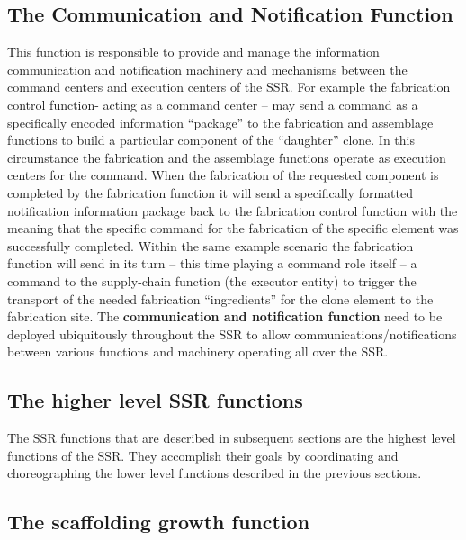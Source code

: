 \subsection[The Communication and Notification Function]{The
Communication and Notification Function}

\hypertarget{RefHeading3090306210128}{}This function is responsible to
provide and manage the information communication and notification
machinery and mechanisms between the command centers and execution
centers of the SSR. For example the fabrication control function-
acting as a command center – may send a command as a specifically
encoded information “package”  to the fabrication and assemblage
functions to build a particular component of the “daughter” clone. In
this circumstance the fabrication and the assemblage functions operate
as execution centers for the command. When the fabrication of the
requested component is completed by the fabrication function it will
send a specifically formatted notification information package back to
the fabrication control function with the meaning that the specific
command for the fabrication of the specific element was successfully
completed. Within the same example scenario the fabrication function
will send in its turn – this time playing a command role itself – a
command to the supply-chain function (the executor entity) to trigger
the transport of the needed fabrication “ingredients” for the clone
element to the fabrication site. The \textbf{communication and
notification function} need to be deployed ubiquitously throughout the
SSR to allow communications/notifications between various functions and
machinery operating all over the SSR.

\subsection[The higher level SSR functions]{The higher level SSR
functions}

\hypertarget{RefHeading3092306210128}{}The SSR functions that are
described in subsequent sections are the highest level functions of the
SSR. They accomplish their goals by coordinating and choreographing the
lower level functions described in the previous sections.

\subsection[The scaffolding growth function]{The scaffolding growth
function}

